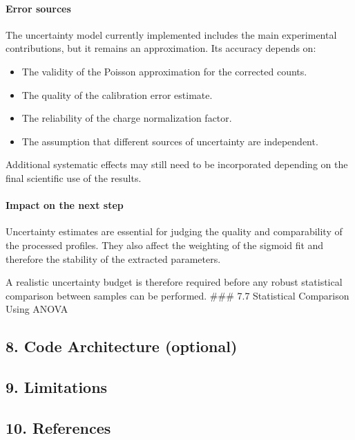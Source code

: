 \hypertarget{error-sources-5}{%
\paragraph{Error sources}\label{error-sources-5}}

The uncertainty model currently implemented includes the main
experimental contributions, but it remains an approximation. Its
accuracy depends on:

\begin{itemize}
\tightlist
\item
  The validity of the Poisson approximation for the corrected counts.
\item
  The quality of the calibration error estimate.
\item
  The reliability of the charge normalization factor.
\item
  The assumption that different sources of uncertainty are independent.
\end{itemize}

Additional systematic effects may still need to be incorporated
depending on the final scientific use of the results.

\hypertarget{impact-on-the-next-step-5}{%
\paragraph{Impact on the next step}\label{impact-on-the-next-step-5}}

Uncertainty estimates are essential for judging the quality and
comparability of the processed profiles. They also affect the weighting
of the sigmoid fit and therefore the stability of the extracted
parameters.

A realistic uncertainty budget is therefore required before any robust
statistical comparison between samples can be performed. \#\#\# 7.7
Statistical Comparison Using ANOVA

\hypertarget{code-architecture-optional}{%
\subsection{8. Code Architecture
(optional)}\label{code-architecture-optional}}

\hypertarget{limitations}{%
\subsection{9. Limitations}\label{limitations}}

\hypertarget{references}{%
\subsection{10. References}\label{references}}
